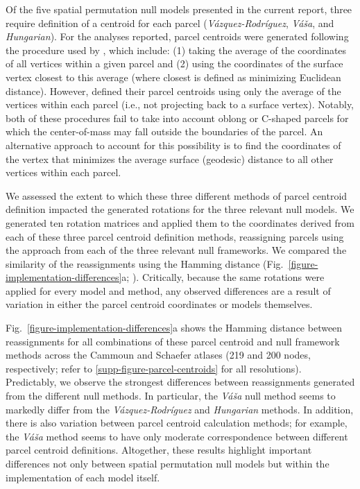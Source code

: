 \documentclass[12pt,aps,pra,reprint,showkeys]{revtex4-1}
\begin{document}
Of the five spatial permutation null models presented in the current report, three require definition of a centroid for each parcel (\textit{V{\'a}zquez-Rodr{\'i}guez}, \textit{V{\'a}{\v{s}}a}, and \textit{Hungarian}).
For the analyses reported, parcel centroids were generated following the procedure used by \citet{vazquezrodriguez2019pnas}, which include: (1) taking the average of the coordinates of all vertices within a given parcel and (2) using the coordinates of the surface vertex closest to this average (where closest is defined as minimizing Euclidean distance).
However, \citet{vasa2018cercor} defined their parcel centroids using only the average of the vertices within each parcel (i.e., not projecting back to a surface vertex).
Notably, both of these procedures fail to take into account oblong or C-shaped parcels for which the center-of-mass may fall outside the boundaries of the parcel.
An alternative approach to account for this possibility is to find the coordinates of the vertex that minimizes the average surface (geodesic) distance to all other vertices within each parcel.

We assessed the extent to which these three different methods of parcel centroid definition impacted the generated rotations for the three relevant null models.
We generated ten rotation matrices and applied them to the coordinates derived from each of these three parcel centroid definition methods, reassigning parcels using the approach from each of the three relevant null frameworks.
We compared the similarity of the reassignments using the Hamming distance (Fig.~\ref{figure-implementation-differences}a; \citealt{hamming1950distance}).
Critically, because the same rotations were applied for every model and method, any observed differences are a result of variation in either the parcel centroid coordinates or models themselves.

Fig.~\ref{figure-implementation-differences}a shows the Hamming distance between reassignments for all combinations of these parcel centroid and null framework methods across the Cammoun and Schaefer atlases (219 and 200 nodes, respectively; refer to \ref{supp-figure-parcel-centroids} for all resolutions).
Predictably, we observe the strongest differences between reassignments generated from the different null methods.
In particular, the \textit{V{\'a}{\v{s}}a} null method seems to markedly differ from the \textit{V{\'a}zquez-Rodr{\'i}guez} and \textit{Hungarian} methods.
In addition, there is also variation between parcel centroid calculation methods; for example, the \textit{V{\'a}{\v{s}}a} method seems to have only moderate correspondence between different parcel centroid definitions.
Altogether, these results highlight important differences not only between spatial permutation null models but within the implementation of each model itself.
\end{document}
